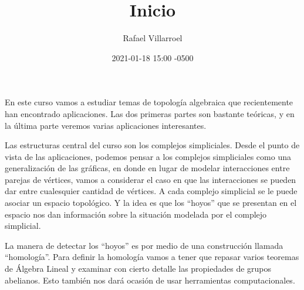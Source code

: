 \documentclass[spanish, presentation]{beamer}
\author{Rafael Villarroel}
\date{2021-01-18 15:00 -0500}
\title{Inicio}
\begin{document}
\maketitle
{}

En este curso vamos a estudiar temas de \alert{topología algebraica} que recientemente han encontrado aplicaciones. Las dos primeras partes son bastante teóricas, y en la última parte veremos varias aplicaciones interesantes.

Las estructuras central del curso son los \alert{complejos simpliciales}. Desde el punto de vista de las aplicaciones, podemos pensar a los complejos simpliciales como una generalización de las gráficas, en donde en lugar de modelar interacciones entre parejas de vértices, vamos a considerar el caso en que las interacciones se pueden dar entre cualesquier cantidad de vértices. A cada complejo simplicial se le puede asociar un espacio topológico. Y la idea es que los ``hoyos'' que se presentan en el espacio nos dan información sobre la situación modelada por el complejo simplicial.

La manera de detectar los ``hoyos'' es por medio de una construcción llamada ``homología''. Para definir la homología vamos a tener que repasar varios teoremas de Álgebra Lineal y examinar con cierto detalle las propiedades de grupos abelianos. Esto también nos dará ocasión de usar herramientas computacionales.
\end{document}
